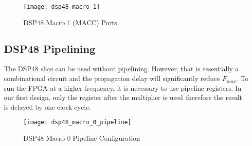\begin{figure}[h]
  \centering
  \texttt{[image: dsp48\_macro\_1]}
  \caption{DSP48 Macro 1 (MACC) Ports}
  \label{fig:dsp48_macro_1}
\end{figure}

\subsection{DSP48 Pipelining}

The DSP48 slice can be used without pipelining. However, that is essentially a combinational circuit and
the propagation delay will significantly reduce $F_{max}$. To run the FPGA at a higher frequency, it is
necessary to use pipeline registers. In our first design, only the register after the multiplier is used
therefore the result is delayed by one clock cycle.

\begin{figure}[h]
  \centering
  \texttt{[image: dsp48\_macro\_0\_pipeline]}
  \caption{DSP48 Macro 0 Pipeline Configuration}
  \label{fig:dsp48_macro_0_pipeline}
\end{figure}

\clearpage %
